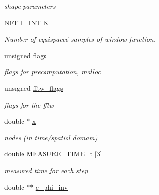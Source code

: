 \begin{DoxyCompactItemize}
\begin{DoxyCompactList}\small\item\em shape parameters \end{DoxyCompactList}\item 
N\-F\-F\-T\-\_\-\-I\-N\-T \hyperlink{structnfst__plan_a077a93c75660389fe050cbef10b0fb5c}{K}
\begin{DoxyCompactList}\small\item\em Number of equispaced samples of window function. \end{DoxyCompactList}\item 
\hypertarget{structnfst__plan_ae7f19a8069c23ce23a05dc3f766fec72}{unsigned \hyperlink{structnfst__plan_ae7f19a8069c23ce23a05dc3f766fec72}{flags}}\label{structnfst__plan_ae7f19a8069c23ce23a05dc3f766fec72}

\begin{DoxyCompactList}\small\item\em flags for precomputation, malloc \end{DoxyCompactList}\item 
\hypertarget{structnfst__plan_a69d37e02b7a2868e3861c582e76e35d8}{unsigned \hyperlink{structnfst__plan_a69d37e02b7a2868e3861c582e76e35d8}{fftw\-\_\-flags}}\label{structnfst__plan_a69d37e02b7a2868e3861c582e76e35d8}

\begin{DoxyCompactList}\small\item\em flags for the fftw \end{DoxyCompactList}\item 
\hypertarget{structnfst__plan_a048ebad4f2abe3821988fa06a5e308d8}{double $\ast$ \hyperlink{structnfst__plan_a048ebad4f2abe3821988fa06a5e308d8}{x}}\label{structnfst__plan_a048ebad4f2abe3821988fa06a5e308d8}

\begin{DoxyCompactList}\small\item\em nodes (in time/spatial domain) \end{DoxyCompactList}\item 
\hypertarget{structnfst__plan_a74e5be807909e0a443ea9b48e0a7da4b}{double \hyperlink{structnfst__plan_a74e5be807909e0a443ea9b48e0a7da4b}{M\-E\-A\-S\-U\-R\-E\-\_\-\-T\-I\-M\-E\-\_\-t} \mbox{[}3\mbox{]}}\label{structnfst__plan_a74e5be807909e0a443ea9b48e0a7da4b}

\begin{DoxyCompactList}\small\item\em measured time for each step \end{DoxyCompactList}\item 
\hypertarget{structnfst__plan_a2c42ae2c8ca95bb4c0c1dfc279bc2cab}{double $\ast$$\ast$ \hyperlink{structnfst__plan_a2c42ae2c8ca95bb4c0c1dfc279bc2cab}{c\-\_\-phi\-\_\-inv}}\label{structnfst__plan_a2c42ae2c8ca95bb4c0c1dfc279bc2cab}


\end{DoxyCompactItemize}
